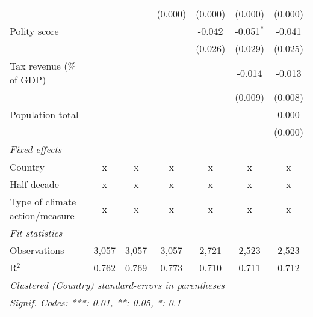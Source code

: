 \begin{tabular}{lcccccc}
                                                                          &              &               & (0.000)        & (0.000)        & (0.000)        & (0.000)\\   
   Polity score                                                           &              &               &                & -0.042         & -0.051$^{*}$   & -0.041\\   
                                                                          &              &               &                & (0.026)        & (0.029)        & (0.025)\\   
   Tax revenue (\% of GDP)                                                &              &               &                &                & -0.014         & -0.013\\   
                                                                          &              &               &                &                & (0.009)        & (0.008)\\   
   Population total                                                       &              &               &                &                &                & 0.000\\   
                                                                          &              &               &                &                &                & (0.000)\\   
   \emph{Fixed effects}\\
   Country                                                                & x            & x             & x              & x              & x              & x\\  
   Half decade                                                            & x            & x             & x              & x              & x              & x\\  
   Type of climate action/measure                                         & x            & x             & x              & x              & x              & x\\  
   \midrule \emph{Fit statistics}\\
   Observations                                                           & 3,057        & 3,057         & 3,057          & 2,721          & 2,523          & 2,523\\  
   R$^2$                                                                  & 0.762        & 0.769         & 0.773          & 0.710          & 0.711          & 0.712\\  
   \midrule
   \multicolumn{7}{l}{\emph{Clustered (Country) standard-errors in parentheses}}\\
   \multicolumn{7}{l}{\emph{Signif. Codes: ***: 0.01, **: 0.05, *: 0.1}}\\
\end{tabular}
\par\endgroup


